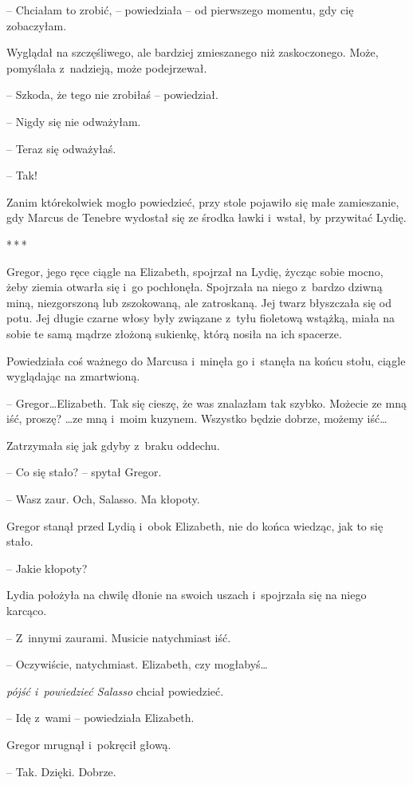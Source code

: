 \documentclass[oneside,polish,12pt,sfheadings]{mwbk}
\newcommand{\threeast}{\bigskip\par\centerline{*\,*\,*}\medskip\par}%
\begin{document}
-- Chciałam to zrobić, -- powiedziała -- od pierwszego momentu, gdy cię
zobaczyłam.

Wyglądał na szczęśliwego, ale bardziej zmieszanego niż zaskoczonego.
Może, pomyślała z~nadzieją, może podejrzewał.

-- Szkoda, że tego nie zrobiłaś -- powiedział.

-- Nigdy się nie odważyłam.

-- Teraz się odważyłaś.

-- Tak!

Zanim którekolwiek mogło powiedzieć, przy stole pojawiło się małe
zamieszanie, gdy Marcus de Tenebre wydostał się ze środka ławki i~wstał,
by przywitać Lydię.

\threeast

Gregor, jego ręce ciągle na Elizabeth, spojrzał na Lydię, życząc sobie
mocno, żeby ziemia otwarła się i~go pochłonęła. Spojrzała na niego z~bardzo dziwną miną, niezgorszoną lub zszokowaną, ale zatroskaną. Jej
twarz błyszczała się od potu. Jej długie czarne włosy były związane z~tyłu fioletową wstążką, miała na sobie te samą mądrze złożoną sukienkę,
którą nosiła na ich spacerze.

Powiedziała coś ważnego do Marcusa i~minęła go i~stanęła na końcu stołu,
ciągle wyglądając na zmartwioną.

-- Gregor\ldots Elizabeth. Tak się cieszę, że was znalazłam tak szybko.
Możecie ze mną iść, proszę? \ldots ze mną i~moim kuzynem. Wszystko będzie
dobrze, możemy iść\ldots

Zatrzymała się jak gdyby z~braku oddechu.

-- Co się stało? -- spytał Gregor.

-- Wasz zaur. Och, Salasso. Ma kłopoty.

Gregor stanął przed Lydią i~obok Elizabeth, nie do końca wiedząc, jak to
się stało.

-- Jakie kłopoty?

Lydia położyła na chwilę dłonie na swoich uszach i~spojrzała się na
niego karcąco.

-- Z~innymi zaurami. Musicie natychmiast iść.

-- Oczywiście, natychmiast. Elizabeth, czy mogłabyś\ldots

\emph{pójść i~powiedzieć Salasso} chciał powiedzieć.

-- Idę z~wami -- powiedziała Elizabeth.

Gregor mrugnął i~pokręcił głową.

-- Tak. Dzięki. Dobrze.
\end{document}
